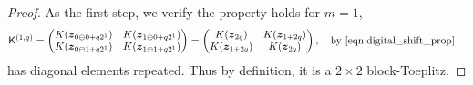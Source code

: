 \documentclass[graybox,footinfo]{svmult}
\newcommand{\bm}[1]{\boldsymbol{#1}}
\newcommand{\vz}{\bm{z}}
\newcommand{\mK}{\mathsf{K}}
\begin{document}
\begin{proof}
	\iftrue
	As the first step, we verify the property holds for $m=1$,
	\begin{align*}
	\mK^{(1, q)} &= \begin{pmatrix}
	K(\vz_{0 \ominus 0 + q 2^1}) & K(\vz_{1 \ominus 0 + q 2^1})  \\
	K(\vz_{0 \ominus 1 + q 2^1}) & K(\vz_{1 \ominus 1 + q 2^1})  
	\end{pmatrix} = 
	\begin{pmatrix}
	K(\vz_{2q}) & K(\vz_{1 + 2q}) \\ K(\vz_{1 + 2q}) & K(\vz_{2q})
	\end{pmatrix}, \quad \text{by \eqref{eqn:digital_shift_prop}}
	\end{align*} has diagonal elements repeated. Thus by definition, it is a $2\times 2$ block-Toeplitz.
	\fi 
	

\end{proof}
\end{document}
